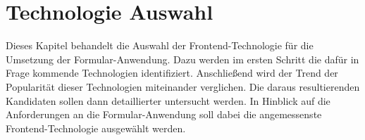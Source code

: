 \section{Technologie Auswahl}

Dieses Kapitel behandelt die Auswahl der Frontend-Technologie für die Umsetzung der Formular-Anwendung. Dazu  werden im ersten Schritt die dafür in Frage kommende Technologien identifiziert.  Anschließend wird der Trend der Popularität dieser Technologien miteinander verglichen. Die daraus resultierenden Kandidaten sollen dann  detaillierter untersucht werden. In Hinblick auf die Anforderungen an die Formular-Anwendung soll dabei die angemessenste Frontend-Technologie ausgewählt werden.



